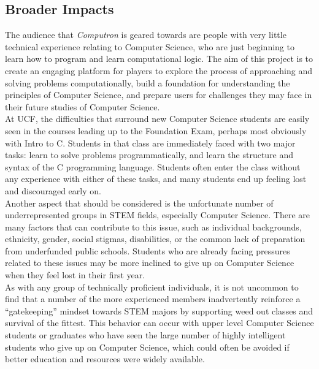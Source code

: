 \subsection{Broader Impacts}

The audience that \textit{Computron} is geared towards are people with very little 
technical experience relating to Computer Science, who are just beginning to
learn how to program and learn computational logic. The aim of this project is
to create an engaging platform for players to explore the process of approaching
and solving problems computationally, build a foundation for understanding the
principles of Computer Science, and prepare users for challenges they may face
in their future studies of Computer Science.\\

At UCF, the difficulties that surround new Computer Science students are easily
seen in the courses leading up to the Foundation Exam, perhaps most obviously
with Intro to C. Students in that class are immediately faced with two major
tasks: learn to solve problems programmatically, and learn the structure and
syntax of the C programming language. Students often enter the class without
any experience with either of these tasks, and many students end up feeling
lost and discouraged early on.\\

Another aspect that should be considered is the unfortunate number of
underrepresented groups in STEM fields, especially Computer Science. There are
many factors that can contribute to this issue, such as individual backgrounds,
ethnicity, gender, social stigmas, disabilities, or the common lack of
preparation from underfunded public schools. Students who are already facing
pressures related to these issues may be more inclined to give up on Computer
Science when they feel lost in their first year.\\

As with any group of technically proficient individuals, it is not uncommon to
find that a number of the more experienced members inadvertently reinforce a
“gatekeeping” mindset towards STEM majors by supporting weed out classes and
survival of the fittest. This behavior can occur with upper level Computer
Science students or graduates who have seen the large number of highly
intelligent students who give up on Computer Science, which could often
be avoided if better education and resources were widely available.\\


